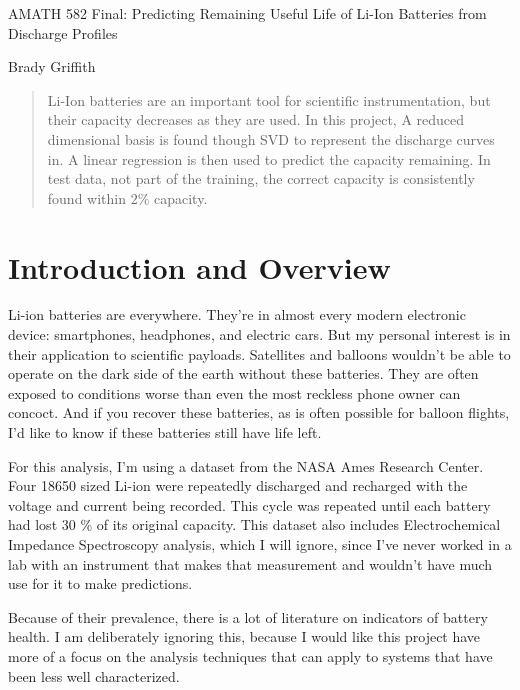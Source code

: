 \documentclass{article}
\begin{document}
    \begin{center}
        \Large AMATH 582 Final: Predicting Remaining Useful Life of Li-Ion
        Batteries from Discharge Profiles \par
        \large Brady Griffith
    \end{center}

    \begin{abstract}
        Li-Ion batteries are an important tool for scientific instrumentation,
        but their capacity decreases as they are used. In this project, A
        reduced dimensional basis is found though SVD to represent the discharge
        curves in. A linear regression is then used to predict the capacity
        remaining. In test data, not part of the training, the correct capacity
        is consistently found within $2 \%$ capacity.
    \end{abstract}

    \section{Introduction and Overview}
    Li-ion batteries are everywhere. They're in almost every modern
    electronic device: smartphones, headphones, and electric cars. But my
    personal interest is in their application to scientific payloads.
    Satellites and balloons wouldn't be able to operate on the dark side
    of the earth without these batteries. They are often exposed to conditions
    worse than even the most reckless phone owner can concoct. And if you
    recover these batteries, as is often possible for balloon flights, I'd like
    to know if these batteries still have life left.

    For this analysis, I'm using a dataset from the NASA Ames Research Center.
    \cite{bat_data}
    Four 18650 sized Li-ion were repeatedly discharged and recharged with the
    voltage and current being recorded. This cycle was repeated until each
    battery had lost 30 \% of its original capacity. This dataset also includes
    Electrochemical Impedance Spectroscopy analysis, which I will ignore, since
    I've never worked in a lab with an instrument that makes that measurement
    and wouldn't have much use for it to make predictions.

    Because of their prevalence, there is a lot of literature on indicators of
    battery health. I am deliberately ignoring this, because I would like this
    project have more of a focus on the analysis techniques that can apply to
    systems that have been less well characterized.
\end{document}
